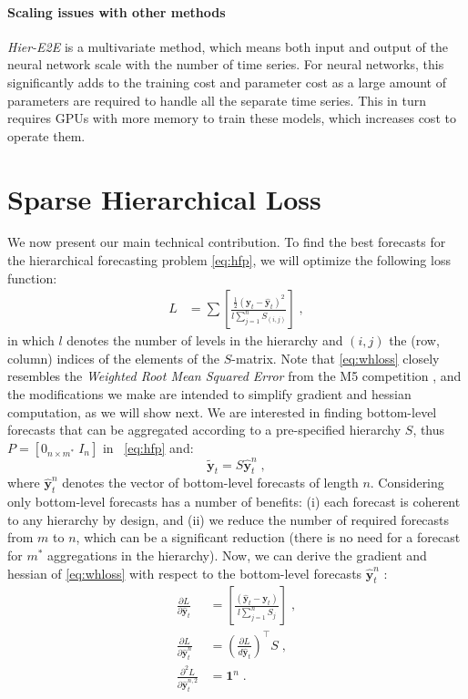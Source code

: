 \documentclass[preprint, 3p, times, twocolumn]{elsarticle}
\begin{document}
\paragraph{Scaling issues with other methods} \textit{Hier-E2E} \cite{rangapuram_endtoend_2021} is a multivariate method, which means both input and output of the neural network scale with the number of time series. For neural networks, this significantly adds to the training cost and parameter cost as a large amount of parameters are required to handle all the separate time series. This in turn requires GPUs with more memory to train these models, which increases cost to operate them. 

\section{Sparse Hierarchical Loss}
We now present our main technical contribution. To find the best forecasts for the hierarchical forecasting problem \eqref{eq:hfp}, we will optimize the following loss function:
\begin{align} \label{eq:whloss}
  L &= \sum \left[ \frac{\frac{1}{2}(\textbf{y}_{t} - \hat{\textbf{y}}_{t})^2}{l \sum_{j=1}^n S_{(i,j)}} \right] \; ,
\end{align}
in which \(l\) denotes the number of levels in the hierarchy and \((i, j)\) the (row, column) indices of the elements of the \(S\)-matrix. Note that \eqref{eq:whloss} closely resembles the \textit{Weighted Root Mean Squared Error} from the M5 competition \cite{makridakis_m5_2022}, and the modifications we make are intended to simplify gradient and hessian computation, as we will show next. 
We are interested in finding bottom-level forecasts that can be aggregated according to a pre-specified hierarchy \(S\), thus \(P = [0_{n \times m^*} \; I_n] \) in ~\ref{eq:hfp} and:
\begin{equation} \label{eq:hfpbu}
  \tilde{\textbf{y}}_{t} = S \hat{\textbf{y}}^n_{t} \;,
\end{equation}
where \(\hat{\textbf{y}}^n_{t}\) denotes the vector of bottom-level forecasts of length \(n\). 
Considering only bottom-level forecasts has a number of benefits: (i) each forecast is coherent to any hierarchy by design, and (ii) we reduce the number of required forecasts from \(m\) to \(n\), which can be a significant reduction (there is no need for a forecast for \(m^*\) aggregations in the hierarchy). 
Now, we can derive the gradient and hessian of \eqref{eq:whloss} with respect to the bottom-level forecasts \(\hat{\textbf{y}}^n_{t}\) : 
\begin{align} 
  \frac{\partial L}{\partial \hat{\textbf{y}}_{t}} &=  \left[ \frac{(\hat{\textbf{y}}_{t} - \textbf{y}_{t})}{l \sum_{j=1}^n S_{j}} \right] \;, \label{eq:hfp_grad} \\
  \frac{\partial L}{\partial \hat{\textbf{y}}^n_{t}} &= \left(\frac{\partial L}{d \hat{\textbf{y}}_{t}}\right)^\intercal S \;, \label{eq:hfpbu_grad}  \\
  \frac{\partial^2 L}{\partial \hat{\textbf{y}}_{t}^{n, 2}} &= \mathbf{1}^n \;.                                               
\end{align}
\end{document}
